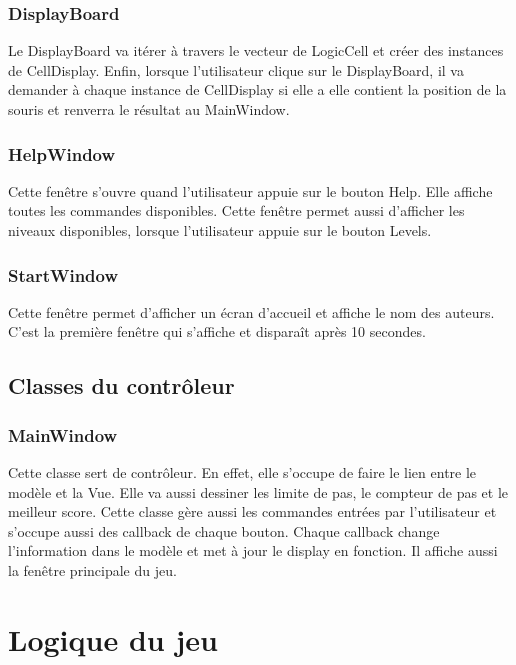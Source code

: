 \documentclass[utf8]{article}
\begin{document}
\begin{large}
\subsubsection{DisplayBoard}
\indent
\par
Le DisplayBoard va itérer à travers le vecteur de LogicCell et créer des
instances de CellDisplay. Enfin, lorsque l'utilisateur clique sur le
DisplayBoard, il va demander à chaque instance de CellDisplay si elle a elle
contient la position de la souris et renverra le résultat au MainWindow.
\par
\subsubsection{HelpWindow}
\indent
\par
Cette fenêtre s'ouvre quand l'utilisateur appuie sur le bouton Help. Elle
affiche toutes les commandes disponibles. Cette fenêtre permet aussi d'afficher
les niveaux disponibles, lorsque l'utilisateur appuie sur le bouton Levels.
\par
\subsubsection{StartWindow}
\indent
\par
Cette fenêtre permet d'afficher un écran d'accueil et affiche le nom des
auteurs. C'est la première fenêtre qui s'affiche et disparaît après 10 secondes.
\par

\subsection{Classes du contrôleur}
\subsubsection{MainWindow}
\indent
\par
Cette classe sert de contrôleur. En effet, elle s'occupe de faire le lien entre
le modèle et la Vue. Elle va aussi dessiner les limite de pas, le compteur de
pas et le meilleur score. Cette classe gère aussi les commandes entrées par
l'utilisateur et s'occupe aussi des callback de chaque bouton. Chaque callback
change l'information dans le modèle et met à jour le display en fonction. Il
affiche aussi la fenêtre principale du jeu.
\par
\section{Logique du jeu}

\end{large}
\end{document}
